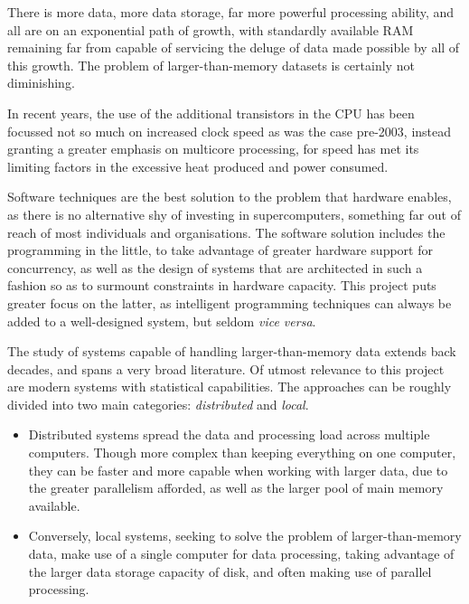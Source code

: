 There is more data, more data storage, far more powerful processing ability, and all are on an exponential path of growth, with standardly available RAM remaining far from capable of servicing the deluge of data made possible by all of this growth\cite{sutter2005free}.
The problem of larger-than-memory datasets is certainly not diminishing.

In recent years, the use of the additional transistors in the CPU has been focussed not so much on increased clock speed as was the case pre-2003, instead granting a greater emphasis on multicore processing, for speed has met its limiting factors in the excessive heat produced and power consumed\cite{sutter2005free}.

Software techniques are the best solution to the problem that hardware enables, as there is no alternative shy of investing in supercomputers, something far out of reach of most individuals and organisations.
The software solution includes the programming in the little, to take advantage of greater hardware support for concurrency, as well as the design of systems that are architected in such a fashion so as to surmount constraints in hardware capacity.
This project puts greater focus on the latter, as intelligent programming techniques can always be added to a well-designed system, but seldom \textit{vice versa}.

The study of systems capable of handling larger-than-memory data extends back decades, and spans a very broad literature.
Of utmost relevance to this project are modern systems with statistical capabilities.
The approaches can be roughly divided into two main categories: \emph{distributed} and \emph{local}.

\begin{itemize}
	\item Distributed systems spread the data and processing load across multiple computers.
Though more complex than keeping everything on one computer, they can be faster and more capable when working with larger data, due to the greater parallelism afforded, as well as the larger pool of main memory available\cite{foster1995parallel}.

\item Conversely, local systems, seeking to solve the problem of larger-than-memory data, make use of a single computer for data processing, taking advantage of the larger data storage capacity of disk, and often making use of parallel processing.
\end{itemize}

